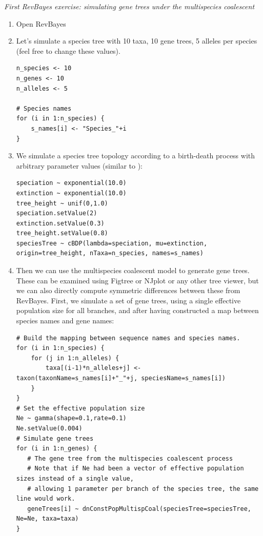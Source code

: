 \documentclass[11pt]{article}
\begin{document}
{\begin{framed}

\begin{center}
\emph{First RevBayes exercise: simulating gene trees under the multispecies coalescent}
\end{center}
\begin{enumerate}
\item Open RevBayes
\item Let's simulate a species tree with 10 taxa, 10 gene trees, 5 alleles per species (feel free to change these values).
{\tt \begin{snugshade*}
\begin{lstlisting}
n_species <- 10
n_genes <- 10
n_alleles <- 5

# Species names
for (i in 1:n_species) {
	s_names[i] <- "Species_"+i
}
\end{lstlisting}
\end{snugshade*}}
\item We simulate a species tree topology according to a birth-death process with arbitrary parameter values (similar to \citet{Leache2011}):
{\tt \begin{snugshade*}
\begin{lstlisting}
speciation ~ exponential(10.0)
extinction ~ exponential(10.0)
tree_height ~ unif(0,1.0)
speciation.setValue(2)
extinction.setValue(0.3)
tree_height.setValue(0.8)
speciesTree ~ cBDP(lambda=speciation, mu=extinction, origin=tree_height, nTaxa=n_species, names=s_names)
\end{lstlisting}
\end{snugshade*}}
\item Then we can use the multispecies coalescent model to generate gene trees. These can be examined using Figtree or NJplot or any other tree viewer, but we can also directly compute symmetric differences between these from RevBayes. First, we simulate a set of gene trees, using a single effective population size for all branches, and after having constructed a map between species names and gene names:
{\tt \begin{snugshade*}
\begin{lstlisting}
# Build the mapping between sequence names and species names.
for (i in 1:n_species) {
	for (j in 1:n_alleles) {
		taxa[(i-1)*n_alleles+j] <- taxon(taxonName=s_names[i]+"_"+j, speciesName=s_names[i])
	}
}
# Set the effective population size
Ne ~ gamma(shape=0.1,rate=0.1)
Ne.setValue(0.004)
# Simulate gene trees
for (i in 1:n_genes) {
   # The gene tree from the multispecies coalescent process
   # Note that if Ne had been a vector of effective population sizes instead of a single value, 
   # allowing 1 parameter per branch of the species tree, the same line would work.
   geneTrees[i] ~ dnConstPopMultispCoal(speciesTree=speciesTree, Ne=Ne, taxa=taxa)
}
\end{lstlisting}
\end{snugshade*}}


\end{enumerate}
\end{framed}}
\end{document}
